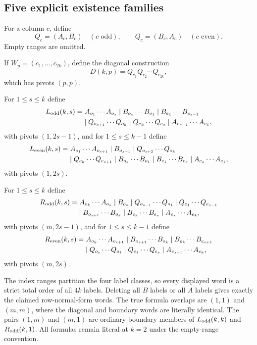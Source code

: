\documentclass[11pt]{article}
\theoremstyle{definition}
\theoremstyle{remark}
\begin{document}
\subsection{Five explicit existence
families}\label{d.3.-five-explicit-existence-families}

For a column \(c\), define \[
Q_c=(A_c,B_c)\quad(c\text{ odd}),\qquad
Q_c=(B_c,A_c)\quad(c\text{ even}).
\] Empty ranges are omitted.

If \(W_p=(c_1,\ldots,c_{2k})\), define the diagonal construction \[
D(k,p)=Q_{c_1}Q_{c_2}\cdots Q_{c_{2k}},
\] which has pivots \((p,p)\).

For \(1\le s\le k\) define \[
\begin{aligned}
L_{\rm odd}(k,s)=&\ A_{o_1}\cdots A_{o_s}\mid B_{o_s}\cdots B_{o_1}\mid B_{e_1}\cdots B_{e_{s-1}}\\
&\mid Q_{o_{s+1}}\cdots Q_{o_k}\mid Q_{e_k}\cdots Q_{e_s}\mid A_{e_{s-1}}\cdots A_{e_1},
\end{aligned}
\] with pivots \((1,2s-1)\), and for \(1\le s\le k-1\) define \[
\begin{aligned}
L_{\rm even}(k,s)=&\ A_{o_1}\cdots A_{o_{s+1}}\mid B_{o_{s+1}}\mid Q_{o_{s+2}}\cdots Q_{o_k}\\
&\mid Q_{e_k}\cdots Q_{e_{s+1}}\mid B_{o_s}\cdots B_{o_1}\mid B_{e_1}\cdots B_{e_s}\mid A_{e_s}\cdots A_{e_1},
\end{aligned}
\] with pivots \((1,2s)\).

For \(1\le s\le k\) define \[
\begin{aligned}
R_{\rm odd}(k,s)=&\ A_{o_k}\cdots A_{o_s}\mid B_{o_s}\mid Q_{o_{s-1}}\cdots Q_{o_1}\mid Q_{e_1}\cdots Q_{e_{s-1}}\\
&\mid B_{o_{s+1}}\cdots B_{o_k}\mid B_{e_k}\cdots B_{e_s}\mid A_{e_s}\cdots A_{e_k},
\end{aligned}
\] with pivots \((m,2s-1)\), and for \(1\le s\le k-1\) define \[
\begin{aligned}
R_{\rm even}(k,s)=&\ A_{o_k}\cdots A_{o_{s+1}}\mid B_{o_{s+1}}\cdots B_{o_k}\mid B_{e_k}\cdots B_{e_{s+1}}\\
&\mid Q_{o_s}\cdots Q_{o_1}\mid Q_{e_1}\cdots Q_{e_s}\mid A_{e_{s+1}}\cdots A_{e_k},
\end{aligned}
\] with pivots \((m,2s)\).

The index ranges partition the four label classes, so every displayed
word is a strict total order of all \(4k\) labels. Deleting all \(B\)
labels or all \(A\) labels gives exactly the claimed row-normal-form
words. The true formula overlaps are \((1,1)\) and \((m,m)\), where the
diagonal and boundary words are literally identical. The pairs \((1,m)\)
and \((m,1)\) are ordinary boundary members of \(L_{\rm odd}(k,k)\) and
\(R_{\rm odd}(k,1)\). All formulas remain literal at \(k=2\) under the
empty-range convention.
\end{document}

